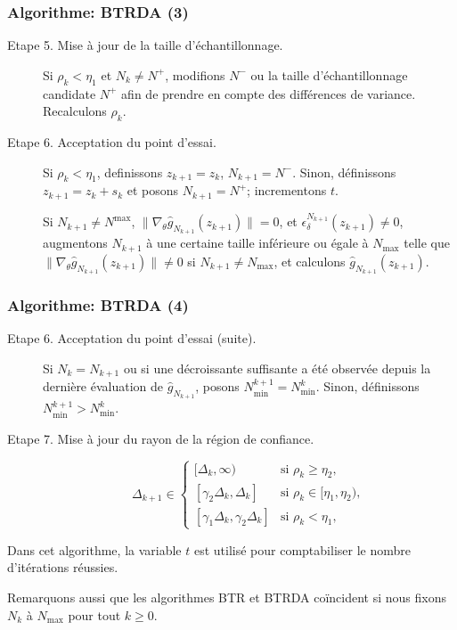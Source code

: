 \documentclass[french]{beamer}
\begin{document}
\begin{frame}
\frametitle{Algorithme: BTRDA (3)}

\begin{description}
\item[Etape 5. Mise à jour de la taille d'échantillonnage.]
Si $\rho_k < \eta_1$ et $N_k \ne N^+$, modifions $N^-$ ou la taille
d'échantillonnage candidate $N^+$ afin de prendre en compte des
différences de variance.
Recalculons $\rho_k$.
\item[Etape 6. Acceptation du point d'essai.]
Si $\rho_k < \eta_1$, definissons $z_{k+1} = z_k$, $N_{k+1} = N^-$.
Sinon, définissons $z_{k+1} = z_k + s_k$ et posons $N_{k+1} = N^+$;
incrementons $t$.

Si $N_{k+1} \ne N^{\max}$, $\| \nabla_{\theta}
\hat{g}_{N_{k+1}}(z_{k+1})\| = 0$, et
$\epsilon_{\delta}^{N_{k+1}}(z_{k+1}) \ne 0$, augmentons $N_{k+1}$ à
une certaine taille inférieure ou égale à $N_{\max}$ telle que $\|
\nabla_{\theta} \hat{g}_{N_{k+1}}(z_{k+1})\| \ne 0$ si $N_{k+1} \ne
N_{\max}$, et calculons $\hat{g}_{N_{k+1}}(z_{k+1})$.
\end{description}

\end{frame}

\begin{frame}
\frametitle{Algorithme: BTRDA (4)}

\begin{description}
\item[Etape 6. Acceptation du point d'essai (suite).]
Si $N_k = N_{k+1}$ ou si une décroissante suffisante a été observée
depuis la dernière évaluation de $\hat{g}_{N_{k+1}}$, posons
$N_{\min}^{k+1} = N_{\min}^k$.
Sinon, définissons $N_{\min}^{k+1} > N^k_{\min}$.

\item[Etape 7. Mise à jour du rayon de la région de confiance.]
\[
\Delta_{k+1} \in \begin{cases}
[\Delta_k, \infty) & \mbox{si } \rho_k \geq \eta_2, \\
[\gamma_2 \Delta_k, \Delta_k] & \mbox{si } \rho_k \in [\eta_1, \eta_2),\\
[\gamma_1 \Delta_k, \gamma_2 \Delta_k] & \mbox{si } \rho_k < \eta_1,
\end{cases}
\]
\end{description}

\mbox{}

Dans cet algorithme, la variable $t$ est utilisé pour comptabiliser le
nombre d'itérations réussies.

\mbox{}

Remarquons aussi que les algorithmes BTR et BTRDA coïncident si nous
fixons $N_k$ à $N_{\max}$ pour tout $k \geq 0$.

\end{frame}
\end{document}
